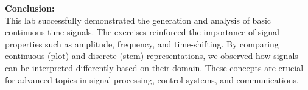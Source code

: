 \documentclass[12pt, a4paper]{article}
\begin{document}
\noindent \textbf{Conclusion:}\\
This lab successfully demonstrated the generation and analysis of basic continuous-time
signals. The exercises reinforced the importance of signal properties such as amplitude,
frequency, and time-shifting. By comparing continuous (plot) and discrete (stem)
representations, we observed how signals can be interpreted differently based on their
domain. These concepts are crucial for advanced topics in signal processing, control systems,
and communications. 
\end{document}

